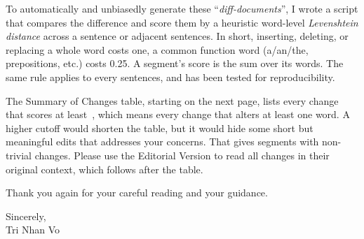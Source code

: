 \documentclass[12pt,a4paper]{article}
\newenvironment{foldable}{}{}
\begin{document}
\begin{foldable}
  To automatically and unbiasedly generate these ``\textit{diff-documents}'', I wrote a script that compares the difference and score them by a heuristic word-level \textit{Levenshtein distance} across a sentence or adjacent sentences.
  In short, inserting, deleting, or replacing a whole word costs one, a common function word (a/an/the, prepositions, etc.) costs 0.25.
  A segment's score is the sum over its words.
  The same rule applies to every sentences, and has been tested for reproducibility.
\end{foldable}

\begin{foldable}
  The Summary of Changes table, starting on the next page, lists every change that scores at least~\mincutoff, which means every change that alters at least one word.
  A higher cutoff would shorten the table, but it would hide some short but meaningful edits that addresses your concerns.
  That gives \nrowslisted{} segments with non-trivial changes.
  Please use the Editorial Version to read all changes in their original context, which follows after the table.
\end{foldable}

\begin{foldable}
  Thank you again for your careful reading and your guidance.
\end{foldable}

Sincerely,\\
Tri Nhan Vo

\clearpage


\end{document}
